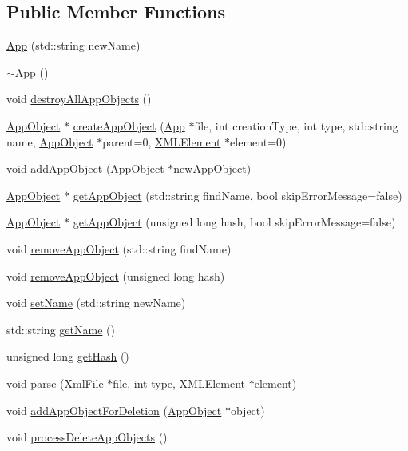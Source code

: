 \subsection*{Public Member Functions}
\begin{DoxyCompactItemize}
\item 
\hyperlink{class_rad_xml_1_1_app_a0220b0f845ff98c6cb0beeef4f73e337}{App} (std\-::string new\-Name)
\item 
\hyperlink{class_rad_xml_1_1_app_add54fea7165ee9c245a169cc841c0a69}{$\sim$\-App} ()
\item 
void \hyperlink{class_rad_xml_1_1_app_aa5cf732b0c32d2feb58f1264e3fedd07}{destroy\-All\-App\-Objects} ()
\item 
\hyperlink{class_rad_xml_1_1_app_object}{App\-Object} $\ast$ \hyperlink{class_rad_xml_1_1_app_a560ad56a8fd00a3f0ff9aff84bc76ae0}{create\-App\-Object} (\hyperlink{class_rad_xml_1_1_app}{App} $\ast$file, int creation\-Type, int type, std\-::string name, \hyperlink{class_rad_xml_1_1_app_object}{App\-Object} $\ast$parent=0, \hyperlink{class_x_m_l_element}{X\-M\-L\-Element} $\ast$element=0)
\item 
void \hyperlink{class_rad_xml_1_1_app_aada472e9f684d69d9a8cc0cec25f8c12}{add\-App\-Object} (\hyperlink{class_rad_xml_1_1_app_object}{App\-Object} $\ast$new\-App\-Object)
\item 
\hyperlink{class_rad_xml_1_1_app_object}{App\-Object} $\ast$ \hyperlink{class_rad_xml_1_1_app_a45cd456028920ffc7ac81275ca1873ca}{get\-App\-Object} (std\-::string find\-Name, bool skip\-Error\-Message=false)
\item 
\hyperlink{class_rad_xml_1_1_app_object}{App\-Object} $\ast$ \hyperlink{class_rad_xml_1_1_app_a02509d6885f8630f70d7a034e25d4fdb}{get\-App\-Object} (unsigned long hash, bool skip\-Error\-Message=false)
\item 
void \hyperlink{class_rad_xml_1_1_app_afdbb555361f4b84b8fdac2daa3d9b4d7}{remove\-App\-Object} (std\-::string find\-Name)
\item 
void \hyperlink{class_rad_xml_1_1_app_a1316f86bd7cd51aaf20e6a5c47da0100}{remove\-App\-Object} (unsigned long hash)
\item 
void \hyperlink{class_rad_xml_1_1_app_a8d3ec62c951346c7108cc219f2cc7202}{set\-Name} (std\-::string new\-Name)
\item 
std\-::string \hyperlink{class_rad_xml_1_1_app_a2d181752fc4490c4c7cc9d764f5bf1d0}{get\-Name} ()
\item 
unsigned long \hyperlink{class_rad_xml_1_1_app_a845ed6d3bae047f254d280511cdd9560}{get\-Hash} ()
\item 
void \hyperlink{class_rad_xml_1_1_app_a0117ad7ae6666eeafc14975abce8a73e}{parse} (\hyperlink{class_rad_xml_1_1_xml_file}{Xml\-File} $\ast$file, int type, \hyperlink{class_x_m_l_element}{X\-M\-L\-Element} $\ast$element)
\item 
void \hyperlink{class_rad_xml_1_1_app_a68c986220fdd3254b9bd9693625d599b}{add\-App\-Object\-For\-Deletion} (\hyperlink{class_rad_xml_1_1_app_object}{App\-Object} $\ast$object)
\item 
void \hyperlink{class_rad_xml_1_1_app_a823de2ec9cc48554f196761c23d0abb2}{process\-Delete\-App\-Objects} ()
\end{DoxyCompactItemize}
